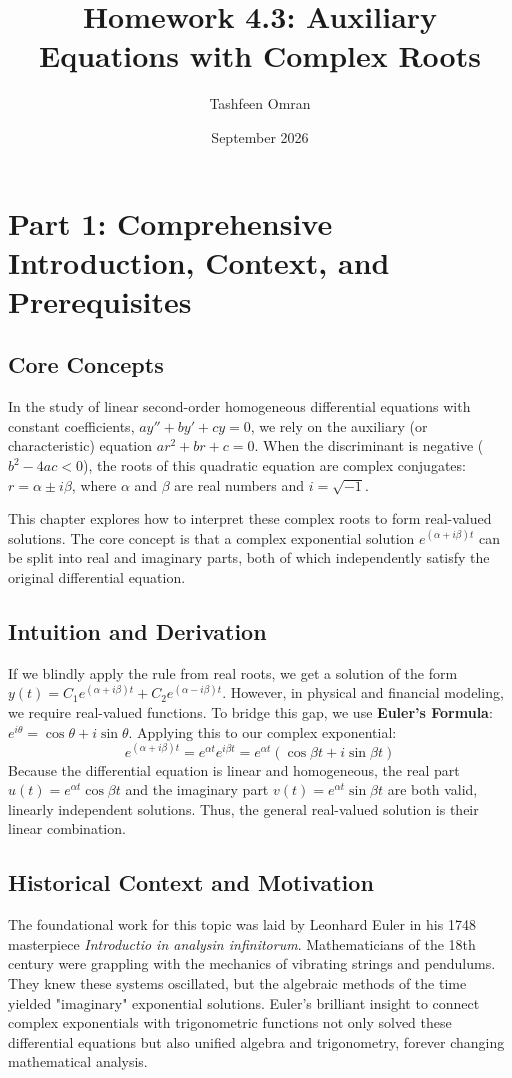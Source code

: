 \documentclass[11pt]{article}
\title{\textbf{Homework 4.3: Auxiliary Equations with Complex Roots}}
\author{Tashfeen Omran}
\date{September 2026}
\begin{document}
\maketitle
\tableofcontents
\newpage

\section{Part 1: Comprehensive Introduction, Context, and Prerequisites}

\subsection{Core Concepts}
In the study of linear second-order homogeneous differential equations with constant coefficients, $ay'' + by' + cy = 0$, we rely on the auxiliary (or characteristic) equation $ar^2 + br + c = 0$. When the discriminant is negative ($b^2 - 4ac < 0$), the roots of this quadratic equation are complex conjugates: $r = \alpha \pm i\beta$, where $\alpha$ and $\beta$ are real numbers and $i = \sqrt{-1}$. 

This chapter explores how to interpret these complex roots to form real-valued solutions. The core concept is that a complex exponential solution $e^{(\alpha + i\beta)t}$ can be split into real and imaginary parts, both of which independently satisfy the original differential equation.

\subsection{Intuition and Derivation}
If we blindly apply the rule from real roots, we get a solution of the form $y(t) = C_1 e^{(\alpha + i\beta)t} + C_2 e^{(\alpha - i\beta)t}$. However, in physical and financial modeling, we require real-valued functions. 
To bridge this gap, we use \textbf{Euler's Formula}: $e^{i\theta} = \cos\theta + i\sin\theta$. 
Applying this to our complex exponential:
\[ e^{(\alpha + i\beta)t} = e^{\alpha t} e^{i\beta t} = e^{\alpha t} (\cos \beta t + i\sin \beta t) \]
Because the differential equation is linear and homogeneous, the real part $u(t) = e^{\alpha t} \cos \beta t$ and the imaginary part $v(t) = e^{\alpha t} \sin \beta t$ are both valid, linearly independent solutions. Thus, the general real-valued solution is their linear combination.

\subsection{Historical Context and Motivation}
The foundational work for this topic was laid by Leonhard Euler in his 1748 masterpiece \textit{Introductio in analysin infinitorum}. Mathematicians of the 18th century were grappling with the mechanics of vibrating strings and pendulums. They knew these systems oscillated, but the algebraic methods of the time yielded "imaginary" exponential solutions. Euler's brilliant insight to connect complex exponentials with trigonometric functions not only solved these differential equations but also unified algebra and trigonometry, forever changing mathematical analysis.
\end{document}
